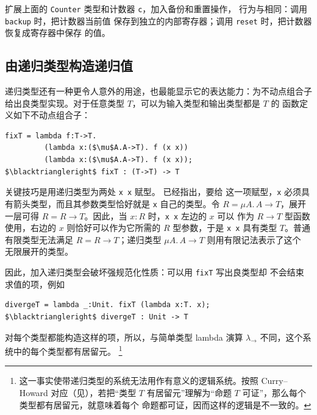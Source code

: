 \begin{exercise}[\(\star\star\)]
\label{ex:20.1.3}
扩展上面的 \texttt{Counter} 类型和计数器 \texttt{c}，加入备份和重置操作，
行为与相同：调用 \texttt{backup} 时，把计数器当前值
保存到独立的内部寄存器；调用 \texttt{reset} 时，把计数器恢复成寄存器中保存
的值。
\end{exercise}

\subsection*{由递归类型构造递归值}

递归类型还有一种更令人意外的用途，也最能显示它的表达能力：为不动点组合子
给出良类型实现。对于任意类型 \(T\)，可以为输入类型和输出类型都是 \(T\) 的
函数定义如下不动点组合子：
\begin{lstlisting}[mathescape=true]
fixT = lambda f:T->T.
         (lambda x:($\mu$A.A->T). f (x x))
         (lambda x:($\mu$A.A->T). f (x x));
$\blacktriangleright$ fixT : (T->T) -> T
\end{lstlisting}
关键技巧是用递归类型为两处 \texttt{x x} 赋型。
已经指出，要给
这一项赋型，\texttt{x} 必须具有箭头类型，而且其参数类型恰好就是
\texttt{x} 自己的类型。令 \(R=\mu A.\,A\to T\)，展开一层可得
\(R=R\to T\)。因此，当 \(x:R\) 时，\texttt{x x} 左边的 \(x\) 可以
作为 \(R\to T\) 型函数使用，右边的 \(x\) 则恰好可以作为它所需的
\(R\) 型参数，于是 \texttt{x x} 具有类型 \(T\)。普通有限类型无法满足
\(R=R\to T\)；递归类型 \(\mu A.\,A\to T\) 则用有限记法表示了这个
无限展开的类型。


因此，加入递归类型会破坏强规范化性质：可以用 \texttt{fixT} 写出良类型却
不会结束求值的项，例如
\begin{lstlisting}[mathescape=true]
divergeT = lambda _:Unit. fixT (lambda x:T. x);
$\blacktriangleright$ divergeT : Unit -> T
\end{lstlisting}
对每个类型都能构造这样的项，所以，与简单类型 lambda 演算
\(\lambda_{\to}\) 不同，这个系统中的每个类型都有居留元。
\footnote{这一事实使带递归类型的系统无法用作有意义的逻辑系统。按照
Curry--Howard 对应（见），若把“类型 \(T\)
有居留元”理解为“命题 \(T\) 可证”，那么每个类型都有居留元，就意味着每个
命题都可证，因而这样的逻辑是不一致的。}

